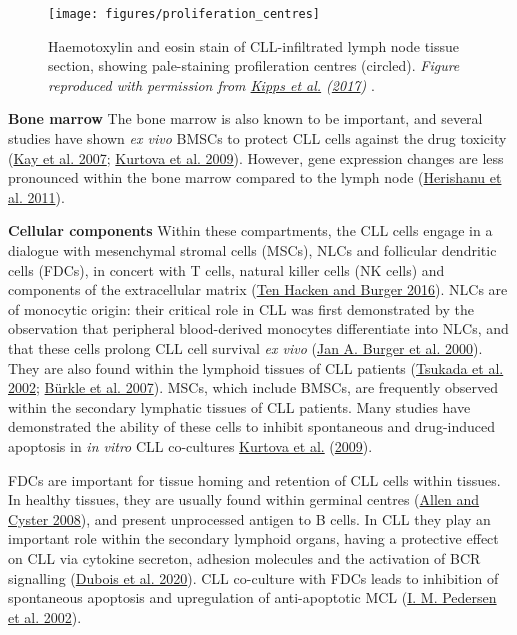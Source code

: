\documentclass[11pt, a4paper, twosided]{book}
\begin{document}
\begin{figure}

{\centering \texttt{[image: figures/proliferation\_centres]} 

}

\caption{Haemotoxylin and eosin stain of CLL-infiltrated lymph node tissue section, showing pale-staining profileration centres (circled). \emph{Figure reproduced with permission from \protect\hyperlink{ref-Kipps2017}{Kipps et al.} (\protect\hyperlink{ref-Kipps2017}{2017}) }.}\label{fig:proliferationCentres}
\end{figure}
\textbf{Bone marrow}
The bone marrow is also known to be important, and several studies have shown \emph{ex vivo} BMSCs to protect CLL cells against the drug toxicity (\protect\hyperlink{ref-Kay2007}{Kay et al. 2007}; \protect\hyperlink{ref-Kurtova2009}{Kurtova et al. 2009}). However, gene expression changes are less pronounced within the bone marrow compared to the lymph node (\protect\hyperlink{ref-Herishanu2011}{Herishanu et al. 2011}).

\textbf{Cellular components}
Within these compartments, the CLL cells engage in a dialogue with mesenchymal stromal cells (MSCs), NLCs and follicular dendritic cells (FDCs), in concert with T cells, natural killer cells (NK cells) and components of the extracellular matrix (\protect\hyperlink{ref-tenHacken2016}{Ten Hacken and Burger 2016}). NLCs are of monocytic origin: their critical role in CLL was first demonstrated by the observation that peripheral blood-derived monocytes differentiate into NLCs, and that these cells prolong CLL cell survival \emph{ex vivo} (\protect\hyperlink{ref-Burger2000}{Jan A. Burger et al. 2000}). They are also found within the lymphoid tissues of CLL patients (\protect\hyperlink{ref-Tsukada2002}{Tsukada et al. 2002}; \protect\hyperlink{ref-Burkle2007}{Bürkle et al. 2007}). MSCs, which include BMSCs, are frequently observed within the secondary lymphatic tissues of CLL patients. Many studies have demonstrated the ability of these cells to inhibit spontaneous and drug-induced apoptosis in \emph{in vitro} CLL co-cultures \protect\hyperlink{ref-Kurtova2009}{Kurtova et al.} (\protect\hyperlink{ref-Kurtova2009}{2009}).

FDCs are important for tissue homing and retention of CLL cells within tissues. In healthy tissues, they are usually found within germinal centres (\protect\hyperlink{ref-Allen2008}{Allen and Cyster 2008}), and present unprocessed antigen to B cells. In CLL they play an important role within the secondary lymphoid organs, having a protective effect on CLL via cytokine secreton, adhesion molecules and the activation of BCR signalling (\protect\hyperlink{ref-Dubois2020}{Dubois et al. 2020}). CLL co-culture with FDCs leads to inhibition of spontaneous apoptosis and upregulation of anti-apoptotic MCL (\protect\hyperlink{ref-Pedersen2002}{I. M. Pedersen et al. 2002}).
\end{document}

